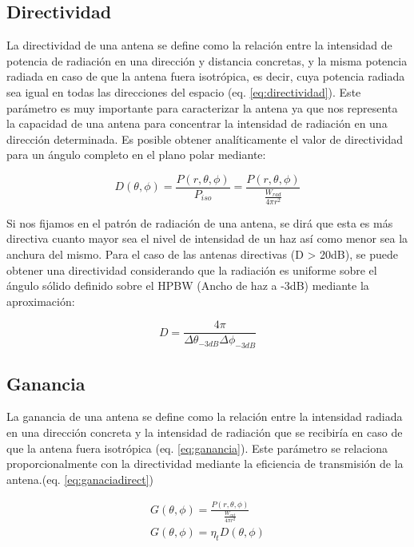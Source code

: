\subsection{Directividad}

\par La directividad de una antena se define como la relación entre la intensidad de potencia de radiación en una dirección y distancia concretas, y la misma potencia radiada en caso de que la antena fuera isotrópica, es decir, cuya potencia radiada sea igual en todas las direcciones del espacio (eq. \ref{eq:directividad}). Este parámetro es muy importante para caracterizar la antena ya que nos representa la capacidad de una antena para concentrar la intensidad de radiación en una dirección determinada. Es posible obtener analíticamente el valor de directividad para un ángulo completo en el plano polar mediante:

\begin{equation}
	D(\theta, \phi )=\frac{P(r,\theta ,\phi)}{P_{iso}}= \frac{P(r,\theta ,\phi)}{\frac{W_{rad}}{4\pi r^{2}}}
	\label{eq:directividad}
\end{equation}

\par Si nos fijamos en el patrón de radiación de una antena, se dirá que esta es más directiva cuanto mayor sea el nivel de intensidad de un haz así como menor sea la anchura del mismo. Para el caso de las antenas directivas (D > 20dB), se puede obtener una directividad considerando que la radiación es uniforme sobre el ángulo sólido definido sobre el HPBW (Ancho de haz a -3dB) mediante la aproximación:

\begin{equation}
	D=\frac{4\pi}{\Delta \theta _{-3dB} \Delta \phi _{-3dB}}
	\label{eq:directividadaprox}
\end{equation}

\subsection{Ganancia}

\par La ganancia de una antena se define como la relación entre la intensidad radiada en una dirección concreta y la intensidad de radiación que se recibiría en caso de que la antena fuera isotrópica (eq. \ref{eq:ganancia}). Este parámetro se relaciona proporcionalmente con la directividad mediante la eficiencia de transmisión de la antena.(eq. \ref{eq:ganaciadirect})


\begin{subequations}
	\begin{eqnarray}
		G(\theta, \phi)=\frac{P(r,\theta, \phi)}{\frac{W_{ent}}{4\pi r^2}} \label{eq:ganancia} \\ %
		G(\theta, \phi)=\eta_{t} D(\theta, \phi) \label{eq:ganaciadirect}
	\end{eqnarray}
\end{subequations}


